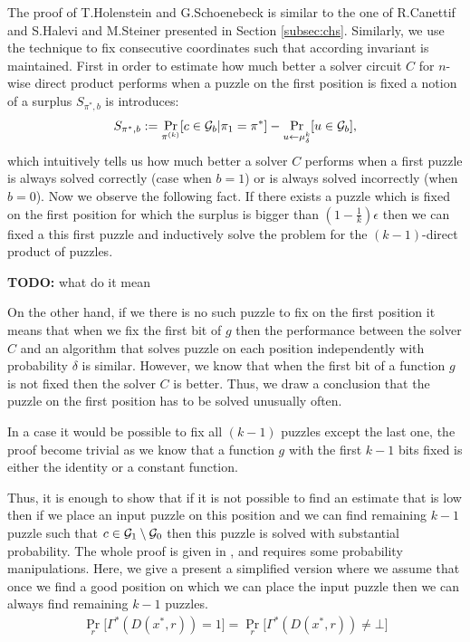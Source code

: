 The proof of T.Holenstein and G.Schoenebeck is similar to the one of R.Canettif and S.Halevi and M.Steiner presented in Section \ref{subsec:chs}.
Similarly, we use the technique to fix consecutive coordinates such that according invariant is maintained.
First in order to estimate how much better a solver circuit $C$ for $n$-wise direct product performs when
a puzzle on the first position is fixed a notion of a surplus $S_{\pi^*, b}$ is introduces:
\begin{align*}
S_{\pi^*, b} := \Pr_{\pi^{(k)}} [ c \in \mathcal{G}_b | \pi_1 = \pi^* ] - \Pr_{u \leftarrow \mu_{\delta}^{k}} [u \in \mathcal{G}_b],
\end{align*}
which intuitively tells us how much better a solver $C$ performs when a first puzzle is always solved correctly (case when $b = 1$)
or is always solved incorrectly (when $b = 0$).
Now we observe the following fact. If there exists a puzzle which is fixed on the first position for which the surplus is bigger than
$(1 - \frac{1}{k})\epsilon$ then we can fixed a this first puzzle and inductively solve the problem for the $(k-1)$-direct product of puzzles.
\begin{todo}
  \textbf{TODO:} what do it mean
\end{todo}
On the other hand, if we there is no such puzzle to fix on the first position it means that when we fix the first bit of $g$ then
the performance between the solver $C$ and an algorithm that solves puzzle on each position independently with probability $\delta$
is similar. However, we know that when the first bit of a function $g$ is not fixed then the solver $C$ is better.
Thus, we draw a conclusion that the puzzle on the first position has to be solved unusually often.

In a case it would be possible to fix all $(k-1)$ puzzles except the last one, the proof become trivial as we know that a function
$g$ with the first $k-1$ bits fixed is either the identity or a constant function.

Thus, it is enough to show that if it is not possible to find an estimate that is low then
if we place an input puzzle on this position and we can find remaining $k-1$ puzzle such that
$c \in \mathcal{G}_1 \setminus \mathcal{G}_0$ then this puzzle is solved with substantial probability.
The whole proof is given in \cite{DBLP:journals/corr/abs-1002-3534}, and requires some probability manipulations.
Here, we give a present a simplified version where we assume that once we find a good position on which we can place the input puzzle then
we can always find remaining $k-1$ puzzles.
\begin{align*}
  \Pr_r\Big[ \Gamma^*(D(x^*,r)) = 1\Big] = \Pr_r\Big[\Gamma^*(D(x^*,r)) \neq \bot \Big]
\end{align*}

